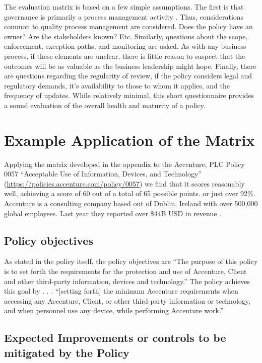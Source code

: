 \documentclass[stu]{apa7}
\begin{document}
The evaluation matrix is based on a few simple assumptions. The first is that governance is primarily a process management activity \parencite{wilkinInformationTechnologyGovernance2020}. Thus, considerations common to quality process management are considered. Does the policy have an owner? Are the stakeholders known? Etc. Similarly, questions about the scope, enforcement, exception paths, and monitoring are asked. As with any business process, if these elements are unclear, there is little reason to suspect that the outcomes will be as valuable as the business leadership might hope. Finally, there are questions regarding the regularity of review, if the policy considers legal and regulatory demands, it's availability to those to whom it applies, and the frequency of updates. While relatively minimal, this short questionnaire provides a sound evaluation of the overall health and maturity of a policy.

\section{Example Application of the Matrix}
\label{sec:org4f3a14a}

Applying the matrix developed in the appendix to the Accenture, PLC Policy 0057 ``Acceptable Use of Information, Devices, and Technology'' (\url{https://policies.accenture.com/policy/0057}) we find that it scores reasonably well, achieving a score of 60 out of a total of 65 possible points. or just over 92\%. Accenture is a consulting company based out of Dublin, Ireland with over 500,000 global employees. Last year they reported over \$44B USD in revenue \parencite{accentureplcAccenture2020Annual2020}.

\subsection{Policy objectives}
\label{sec:org4622852}

As stated in the policy itself, the policy objectives are ``The purpose of this policy is to set forth the requirements for the protection and use of Accenture, Client and other third-party information, devices and technology.'' The policy achieves this goal by . . . ``[setting forth] the minimum Accenture requirements when accessing any Accenture, Client, or other third-party information or technology, and when personnel use any device, while performing Accenture work.''

\subsection{Expected Improvements or controls to be mitigated by the Policy}
\label{sec:orgc92269c}
\end{document}
